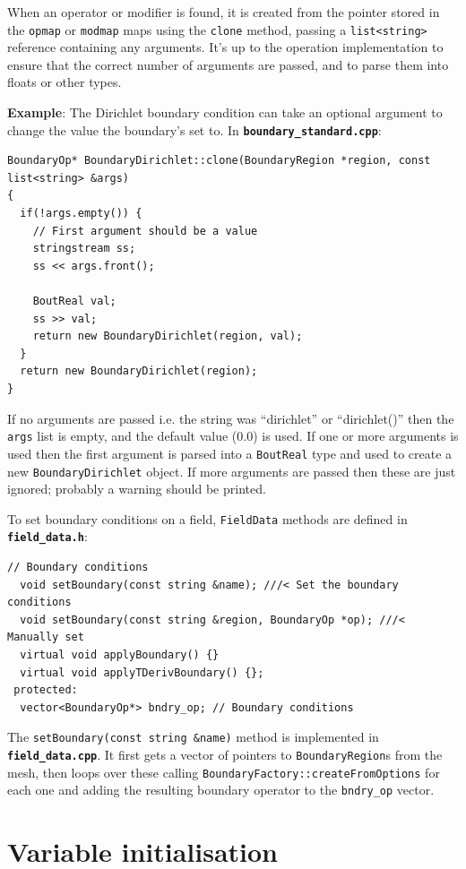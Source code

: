\documentclass[12pt]{article}
\newcommand{\code}[1]{\texttt{#1}}
\newcommand{\file}[1]{\texttt{\bf #1}}
\begin{document}
When an operator or modifier is found, it is created from the pointer
stored in the \code{opmap} or \code{modmap} maps using the
\code{clone} method, passing
a \code{list<string>} reference containing any arguments. It's up
to the operation implementation to ensure that the correct number of
arguments are passed, and to parse them into floats or other types.

{\bf Example}: The Dirichlet boundary condition can take an optional
argument to change the value the boundary's set to. In \file{boundary\_standard.cpp}:
\begin{lstlisting}[firstnumber=13]
BoundaryOp* BoundaryDirichlet::clone(BoundaryRegion *region, const list<string> &args)
{
  if(!args.empty()) {
    // First argument should be a value
    stringstream ss;
    ss << args.front();
    
    BoutReal val;
    ss >> val;
    return new BoundaryDirichlet(region, val);
  }
  return new BoundaryDirichlet(region);
}
\end{lstlisting}
If no arguments are passed i.e. the string was ``dirichlet'' or ``dirichlet()''
then the \code{args} list is empty, and the default value (0.0) is used.
If one or more arguments is used then the first argument is parsed into a
\code{BoutReal} type and used to create a new \code{BoundaryDirichlet} object.
If more arguments are passed then these are just ignored; probably a warning
should be printed.

To set boundary conditions on a field, \code{FieldData} methods are
defined in \file{field\_data.h}: 
\begin{lstlisting}
// Boundary conditions
  void setBoundary(const string &name); ///< Set the boundary conditions
  void setBoundary(const string &region, BoundaryOp *op); ///< Manually set
  virtual void applyBoundary() {}
  virtual void applyTDerivBoundary() {};
 protected:
  vector<BoundaryOp*> bndry_op; // Boundary conditions
\end{lstlisting}
The \code{setBoundary(const string \&name)} method is implemented in
\file{field\_data.cpp}. It first gets a vector of pointers to
\code{BoundaryRegion}s from the mesh, then loops over these calling
\code{BoundaryFactory::createFromOptions} for each one and adding the resulting
boundary operator to the \code{bndry\_op} vector.

\section{Variable initialisation}
\end{document}
